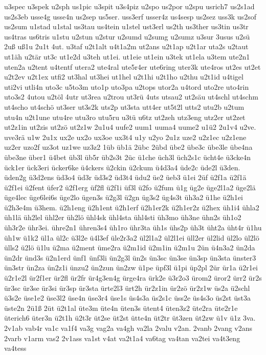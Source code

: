 {u3spec
u3spek
u2sph
us1pic
u3spit
u3s4piz
u2spo
us2por
u2spu
usrich7
us2s1ad
us2s3eb
usse4g
usse4n
us2sep
us5ser.
uss3erf
usser4z
us4sesp
us2sez
uss3k
us2sof
us2sum
u1stad
u1stal
us3tau
us4tein
u1stel
ust3erl
us2th
us3ther
us3tin
us3tr
us4tras
us6tris
u1stu
u2stun
u2stur
u2sumd
u2sumg
u2sumz
u3sur
3usus
u2sü
2uß
uß1u
2u1t
4ut.
u3taf
u2t1alt
u4t1a2m
ut2ans
u2t1ap
u2t1ar
uta2s
u2taut
ut1äh
u2tär
ut3c
ut1e2d
u3teh
ut1ei.
ut1eie
ut1ein
u3tek
ut1ela
u3tem
ute2n1
uten2a
u2tent
u4tentf
utera2
ute4ral
ute5r4er
ute6ring
uter3k
ute4ros
ut2es
ut2et
u2t2ev
u2t1ex
utfi2
ut3hal
ut3hei
ut1hel
u2t1hi
u2t1ho
u2thu
u2t1id
u4tigel
uti2vi
utli4n
uto3c
u5to3m
uto1p
uto3pa
u2tops
utor2a
u4tord
uto2re
uto4rin
uto3s2
4utou
u2töl
4utr
ut3rea
u2trou
ut3rü
4uts
utsau2
ut2säu
ut4schl
ut4schm
ut4scho
ut4schö
ut3ser
ut3s2k
uts2p
ut3sta
utt4er
ut5t2l
utts2
utu2b
u2tum
utu4n
u2t1une
utu4re
utu3ro
utu5ru
u3tü
u6tz
ut2zeh
utz3eng
utz2er
ut2zet
ut2z1in
ut2zis
ut2zö
ut2z1w
2u1u4
uufe2
uum1
uuma4
uume2
u1ü2
2u1v4
u2ve.
uve3rä
u1w
2u1x
ux2e
ux2o
ux3oe
ux3t4
u1y
u2yo
2u1z
uze2
u2z1ec
u2z1ene
uz2er
uzo2f
uz3ot
uz1we
uz3z2
1üb
üb1ä
2übc
2übd
übe2
übe3c
übe3le
übe4na
übe3ne
über1
ü4bet
üb3l
üb5r
üb2s3t
2üc
ü1che
üch3l
üch2s1c
ücht4e
ü3cke4n
ück1er
ück3eri
ücker6ke
ü4ckers
ü2ckin
ü2ckum
ü4d3a4
üde2c
üde2l
ü3den.
üden2g
ü3d2ens
üd3o4
üd3r
üd3s2
üd3t4
üdu2
üe2
üeb3
ü1ei
2üf
ü2f1a
ü2f1ä
ü2f1ei
ü2fent
üfer2
ü2f1erg
üf2fl
ü2f1i
üf3l
ü2fo
ü2fum
ü1g
üg2e
üge2l1a2
üge2lä
üge4lec
üge6lei6s
üge2lo
ügen3s
ü2g3l
ü2gn
üg3s2
üg4s3t
üh3a2
ü1he
ü2h1ei
ü2h3e4m
ü3hem.
ü2h1eng
ü2h1ent
ü2h1erf
ü2h1er2k
ü2h1er2z
ü2hex
üh1i4
ühla2
üh1lä
üh2lel
ühl2er
üh2lö
ühl4sk
ühl4sta
ühl4sti
üh3mo
üh3ne
ühn2s
üh1o2
üh3r2e
ühr3ei.
ühre2n1
ühren3s4
üh1ro
ühr3ta
üh1s
ühs2p
üh3t
üht2a
üht4r
ü1hu
üh1w
ü1k2
ül1a
ül2c
ü3l2e
ü4l3ef
üle2r3a2
ül2l1a2
ül2l1ei
üll2er
ül2lid
ül2lo
ül2lö
ülls2
ü2lö
ü1lu
ü2ma
ü2ment
üme2ra
ü2m1id
ü2m1in
ü2m1u
2ün
ü4n3a2
ün2da
ün2dr
ünd3s
ü2n1erd
ünf1
ünf3li
ün2g3l
ün2s
ün3sc
ün3se
ün3sp
ün3sta
ünster3
ün3str
ün2za
ün2z1i
ünzu2
ün2zun
ün2zw
ü1pe
üpf3l
ü1pi
üp2pl
2ür
ür1a
ü2r1ei
ü2r1e2l
ür2f1er
ür2fl
ür2fr
ür4g3en4g
ürge4ra
ürk2e
ü3r2o3
ürom2
üror2
ürr2
ür2s
ür3sc
ür3se
ür3si
ür3sp
ür3sta
ürte2l3
ürt2h
ür2z1in
ür2zö
ür2z1w
üs2a
ü2schl
ü3s2e
üse1e2
üse3l2
üse4n
üse3r4
üse1s
üs4s3a
üs2s1c
üss2e
üs4s3o
üs2st
üst3a
üste2n
2ü1ß
2üt
ü2t1al
üte3m
üte4n
üten3s
ütent4
üten3z2
üte2ra
üte2r1e
üterich6
üter3n
ü2t1h
ü2t3r
üt2se
üt2st
ütte4n
üt2tr
üt3zen
üt2zw
ü1v
ü1z
3va.
2v1ab
vab4r
va1c
va1f4
va3g
vag2a
va4gh
va2la
2valu
v2an.
2vanb
2vang
v2ans
2varb
v1arm
vas2
2v1ass
va1st
v4at
va2t1a4
va6tag
va4tan
va2tei
va4t3eng
va4tess
}
